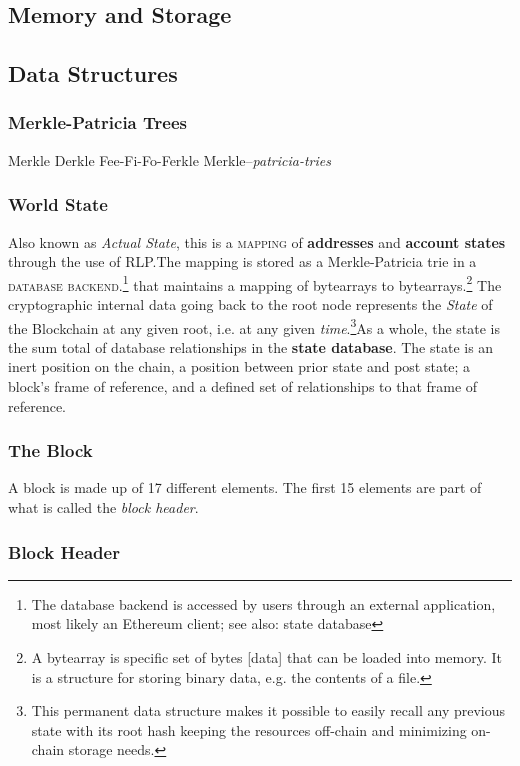 \documentclass[10pt,a4paper,leqno,bibliography=totoc]{scrartcl}
\newenvironment{alphafootnotes}
{\par\edef\savedfootnotenumber{\number\value{footnote}}
\renewcommand{\thefootnote}{\alph{footnote}}
\setcounter{footnote}{0}}
{\par\setcounter{footnote}{\savedfootnotenumber}}
\begin{document}
\begin{alphafootnotes}
\begin{multicols*}{2}
	\section{Memory and Storage}
			
		\subsection{Data Structures}

			\subsubsection{Merkle-Patricia Trees} Merkle Derkle Fee-Fi-Fo-Ferkle Merkle--\textit{patricia-tries}
			
			\subsubsection{World State}
				Also known as \textit{Actual State}, this is a \textsc{mapping} of \textbf{addresses} and \textbf{account states} through the use of RLP.The mapping is stored as a Merkle-Patricia \gls{trie} in a \textsc{database backend}.\footnote{The database backend is accessed by users through an external application, most likely an Ethereum client; see also: \gls{state database}} that maintains a mapping of bytearrays to bytearrays.\footnote{A bytearray is specific set of bytes [data] that can be loaded into memory. It is a structure for storing binary data, e.g. the contents of a file.} The cryptographic internal data going back to the \gls{root node} represents the \textit{State} of the Blockchain at any given root, i.e. at any given \textit{time}.\footnote{This permanent data structure makes it possible to easily recall any previous state with its root hash keeping the resources off-chain and minimizing on-chain storage needs.}As a whole, the state is the sum total of database relationships in the \textbf{ \gls{state database}}. The state is an inert position on the chain, a position between prior state and post state; a block's frame of reference, and a defined set of relationships to that frame of reference.


			\subsubsection{The Block}
				A block is made up of 17 different elements. The first 15 elements are part of what is called the \textsl{block header}.


				\subsubsection{Block Header}

\end{multicols*}
\end{alphafootnotes}
\end{document}
